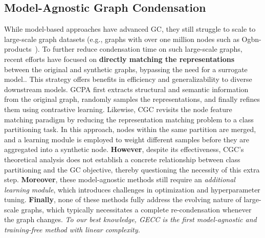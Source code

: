 \subsection{Model-Agnostic Graph Condensation}
While model-based approaches have advanced GC, they still struggle to scale to large-scale graph datasets (e.g., graphs with over one million nodes such as Ogbn-products~\citep{hu2021ogb}). To further reduce condensation time on such large-scale graphs, recent efforts have focused on \textbf{directly matching the representations} between the original and synthetic graphs, bypassing the need for a surrogate model.. This strategy offers benefits in efficiency and generalizability to diverse downstream models. GCPA \citep{li2025a} first extracts structural and semantic information from the original graph, randomly samples the representations, and finally refines them using contrastive learning. Likewise, CGC \citep{gao2024rethinking} revisits the node feature matching paradigm by reducing the representation matching problem to a class partitioning task. In this approach, nodes within the same partition are merged, and a learning module is employed to weight different samples before they are aggregated into a synthetic node. \textbf{However}, despite its effectiveness, CGC's theoretical analysis does not establish a concrete relationship between class partitioning and the GC objective, thereby questioning the necessity of this extra step. \textbf{Moreover}, these model-agnostic methods still require an \textit{additional learning module}, which introduces challenges in optimization and hyperparameter tuning. \textbf{Finally}, none of these methods fully address the evolving nature of large-scale graphs, which typically necessitates a complete re-condensation whenever the graph changes. \textit{To our best knowledge, GECC is the first model-agnostic and training-free method with linear complexity.}



